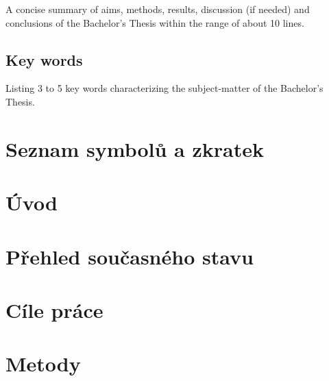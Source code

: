 \documentclass[a4paper,12pt]{article}   %
\numberwithin{equation}{section}        %
\begin{document}
        A concise summary of aims, methods, results, discussion (if needed) and conclusions of the Bachelor’s Thesis within the range of about 10 lines.
    
	\subsection*{Key words}
		Listing 3 to 5 key words characterizing the subject-matter of the Bachelor's Thesis.
	\clearpage
	
    \pagestyle{plain}	%
	
	\tableofcontents			%

	\clearpage

	\section*{Seznam symbolů a zkratek} %
	
	\clearpage
		
	
		
	
	
	
	\section{Úvod}
	
	\clearpage
	
	\section{Přehled současného stavu}
	
	\clearpage
	
    \section{Cíle práce}
	
	\clearpage
	
	\section{Metody}
	
	\clearpage
	
\end{document}
